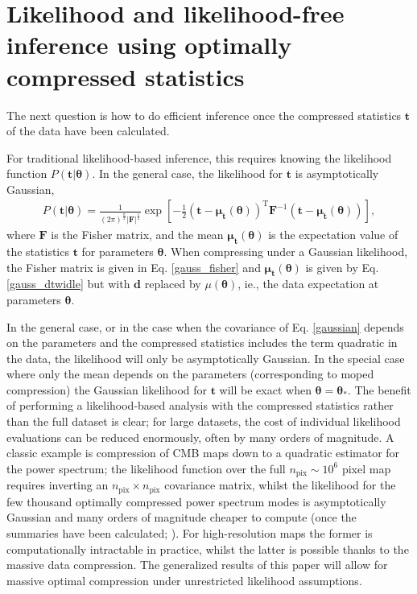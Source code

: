 \documentclass[fleqn,usenatbib]{mnras}
\def\f{\frac}
\def\btheta{\boldsymbol{\theta}}
\def\data{\mathbf{d}}
\def\mean{\boldsymbol{\mu}}
\def\transpose{\mathrm{T}}
\def\transpose{\mathrm{T}}
\begin{document}
\section{Likelihood and likelihood-free inference using optimally compressed statistics}
\label{sec:llfi}
%
The next question is how to do efficient inference once the compressed statistics $\mathbf{t}$ of the data have been calculated. 

For traditional likelihood-based inference, this requires knowing the likelihood function $P(\mathbf{t} | \btheta)$. In the general case, the likelihood for $\mathbf{t}$ is asymptotically Gaussian,
\begin{align}
P(\mathbf{t} | \btheta) = \f{1}{(2\pi)^{\f{n}{2}}|\mathbf{F}|^\f{1}{2}}\mathrm{\exp}\left[-\f{1}{2}(\mathbf{t} - \mean_\mathbf{t}(\btheta))^\transpose\mathbf{F}^{-1}(\mathbf{t} - \mean_\mathbf{t}(\btheta))\right],
\end{align}
where $\mathbf{F}$ is the Fisher matrix, and the mean $\mean_\mathbf{t}(\btheta)$ is the expectation value of the statistics $\mathbf{t}$ for parameters $\btheta$. When compressing under a Gaussian likelihood, the Fisher matrix is given in Eq. \eqref{gauss_fisher} and $\mean_\mathbf{t}(\btheta)$ is given by Eq. \eqref{gauss_dtwidle} but with $\data$ replaced by $\mu(\btheta)$, ie., the data expectation at parameters $\btheta$.

In the general case, or in the case when the covariance of Eq. \eqref{gaussian} depends on the parameters and the compressed statistics includes the term quadratic in the data, the likelihood will only be asymptotically Gaussian. In the special case where only the mean depends on the parameters (corresponding to {\sc moped} compression) the Gaussian likelihood for $\mathbf{t}$ will be exact when $\btheta=\btheta_\ast$. The benefit of performing a likelihood-based analysis with the compressed statistics rather than the full dataset is clear; for large datasets, the cost of individual likelihood evaluations can be reduced enormously, often by many orders of magnitude. A classic example is compression of CMB maps down to a quadratic estimator for the power spectrum; the likelihood function over the full $n_\mathrm{pix}\sim 10^6$ pixel map requires inverting an $n_\mathrm{pix}\times n_\mathrm{pix}$ covariance matrix, whilst the likelihood for the few thousand optimally compressed power spectrum modes is asymptotically Gaussian and many orders of magnitude cheaper to compute (once the summaries have been calculated; \citealp{Tegmark1997}). For high-resolution maps the former is computationally intractable in practice, whilst the latter is possible thanks to the massive data compression. The generalized results of this paper will allow for massive optimal compression under unrestricted likelihood assumptions.
\end{document}
